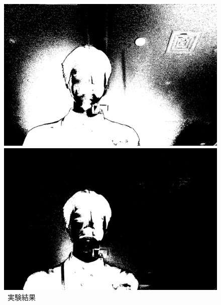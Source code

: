 \begin{figure}[H]
\begin{minipage}[b]{.49\textwidth}
\begin{minipage}[b]{.3\textwidth}
        \end{minipage}
        \caption{\kadaiaf\ 実験結果}
    \end{minipage}
    \nextfloat
    \begin{minipage}[b]{.49\textwidth}
        \centering
        \begin{minipage}[b]{.3\textwidth}
            \centering
            \includegraphics[keepaspectratio,width=\textwidth]{../../Figures/05_61.png}
        \end{minipage}
        \begin{minipage}[b]{.3\textwidth}
            \centering
            \includegraphics[keepaspectratio,width=\textwidth]{../../Figures/05_62.png}
        \end{minipage}
        \begin{minipage}[b]{.3\textwidth}

\end{minipage}
\end{minipage}
\end{figure}
